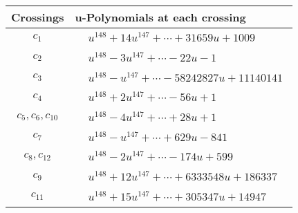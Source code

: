 \documentclass[1p]{elsarticle_modified}
\theoremstyle{definition}
\begin{document}
\begin{tabular}{m{50pt}|m{274pt}}
Crossings & \hspace{64pt}u-Polynomials at each crossing \\
\hline $$\begin{aligned}c_{1}\end{aligned}$$&$\begin{aligned}
&u^{148}+14 u^{147}+\cdots+31659 u+1009
\end{aligned}$\\
\hline $$\begin{aligned}c_{2}\end{aligned}$$&$\begin{aligned}
&u^{148}-3 u^{147}+\cdots-22 u-1
\end{aligned}$\\
\hline $$\begin{aligned}c_{3}\end{aligned}$$&$\begin{aligned}
&u^{148}- u^{147}+\cdots-58242827 u+11140141
\end{aligned}$\\
\hline $$\begin{aligned}c_{4}\end{aligned}$$&$\begin{aligned}
&u^{148}+2 u^{147}+\cdots-56 u+1
\end{aligned}$\\
\hline $$\begin{aligned}c_{5},c_{6},c_{10}\end{aligned}$$&$\begin{aligned}
&u^{148}-4 u^{147}+\cdots+28 u+1
\end{aligned}$\\
\hline $$\begin{aligned}c_{7}\end{aligned}$$&$\begin{aligned}
&u^{148}- u^{147}+\cdots+629 u-841
\end{aligned}$\\
\hline $$\begin{aligned}c_{8},c_{12}\end{aligned}$$&$\begin{aligned}
&u^{148}-2 u^{147}+\cdots-174 u+599
\end{aligned}$\\
\hline $$\begin{aligned}c_{9}\end{aligned}$$&$\begin{aligned}
&u^{148}+12 u^{147}+\cdots+6333548 u+186337
\end{aligned}$\\
\hline $$\begin{aligned}c_{11}\end{aligned}$$&$\begin{aligned}
&u^{148}+15 u^{147}+\cdots+305347 u+14947
\end{aligned}$\\
\hline
\end{tabular}\\~\\
\end{document}
